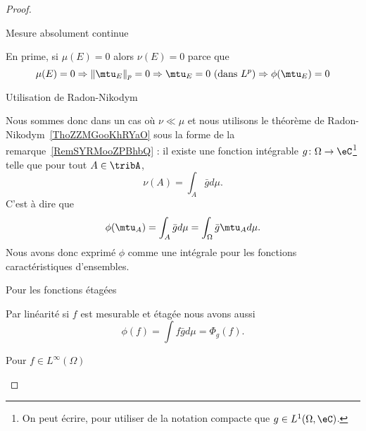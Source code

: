 \begin{proof}
\begin{subproof}
        \item[Mesure absolument continue]

            En prime, si \( \mu(E)=0\) alors \( \nu(E)=0\) parce que
            \begin{equation}
                \mu(E)=0\Rightarrow \| \mtu_E \|_p=0\Rightarrow \mtu_E=0\text{ (dans } L^p\text{)}\Rightarrow\phi(\mtu_E)=0
            \end{equation}

        \item[Utilisation de Radon-Nikodym]

            Nous sommes donc dans un cas où \( \nu\ll\mu\) et nous utilisons le théorème de Radon-Nikodym~\ref{ThoZZMGooKhRYaO} sous la forme de la remarque~\ref{RemSYRMooZPBhbQ} : il existe une fonction intégrable \( g\colon \Omega\to \eC\)\footnote{On peut écrire, pour utiliser de la notation compacte que $ g\in L^1(\Omega,\eC)$.} telle que pour tout \( A\in\tribA\),
            \begin{equation}
                \nu(A)=\int_A\bar gd\mu.
            \end{equation}
            C'est à dire que
            \begin{equation}
                \phi(\mtu_A)=\int_A\bar gd\mu=\int_{\Omega}\bar g\mtu_Ad\mu.
            \end{equation}
            Nous avons donc exprimé \( \phi\) comme une intégrale pour les fonctions caractéristiques d'ensembles.

        \item[Pour les fonctions étagées]

            Par linéarité si \( f\) est mesurable et étagée nous avons aussi
            \begin{equation}
                \phi(f)=\int f\bar gd\mu=\Phi_g(f).
            \end{equation}

        \item[Pour \( f\in L^{\infty}(\Omega)\)]


\end{subproof}
\end{proof}

